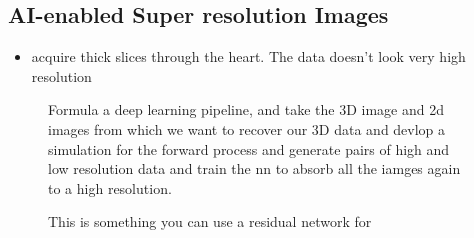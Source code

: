 \documentclass[11pt]{article}
\begin{document}
\subsection{AI-enabled Super resolution Images}

\begin{minipage}[l]{.5\linewidth}
    \begin{figure}[H]
        \centering
    \end{figure}    
\end{minipage}\hfill
\begin{minipage}[r]{.48\linewidth}
    \begin{itemize}
        \item acquire thick slices through the heart. The data doesn't look very high resolution
    \end{itemize}
\end{minipage}

\begin{figure}[H]
    \centering
    \caption*{Formula a deep learning pipeline, and take the 3D image and 2d images from which we want to recover our 3D data and devlop a simulation for the forward process and generate pairs of high and low resolution data and train the nn to absorb all the iamges again to a high resolution.}
\end{figure}   

\begin{figure}[H]
    \centering
    \caption*{This is something you can use a residual network for}
\end{figure}  

\printbibliography
{}
\end{document}
